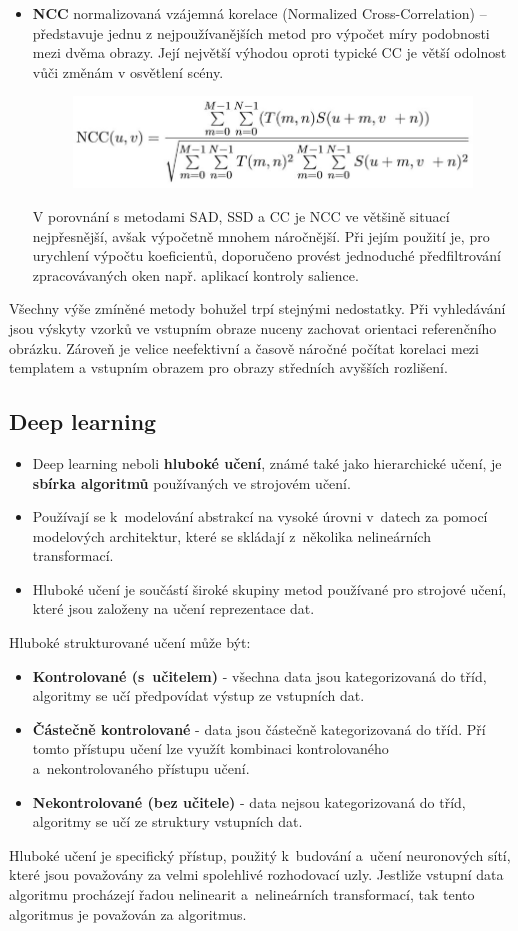 \begin{itemize}
\item \textbf{NCC} normalizovaná vzájemná korelace (Normalized Cross-Correlation) -- představuje jednu z nejpoužívanějších metod pro výpočet míry podobnosti mezi dvěma obrazy. Její největší výhodou oproti typické CC je větší odolnost vůči změnám v osvětlení scény.
\begin{figure}[H]
\centering
\includegraphics[width=.6\linewidth]{assets/9_ncc}
\end{figure}
V porovnání s metodami SAD, SSD a CC je NCC ve většině situací nejpřesnější, avšak výpočetně mnohem náročnější. Při jejím použití je, pro urychlení výpočtu koeficientů, doporučeno provést jednoduché předfiltrování zpracovávaných oken např. aplikací kontroly salience.
\end{itemize}
Všechny výše zmíněné metody bohužel trpí stejnými nedostatky. Při vyhledávání jsou výskyty vzorků ve vstupním obraze nuceny zachovat orientaci referenčního obrázku. Zároveň je velice neefektivní a časově náročné počítat korelaci mezi templatem a vstupním obrazem pro obrazy středních avyšších rozlišení.

\subsection{Deep learning}
\begin{itemize}
  \item Deep learning neboli \textbf{hluboké učení}, známé také jako hierarchické učení, je \textbf{sbírka algoritmů} používaných ve strojovém učení.
  \item Používají se k~modelování abstrakcí na vysoké úrovni v~datech za pomocí modelových architektur, které se skládají z~několika nelineárních transformací.
  \item Hluboké učení je součástí široké skupiny metod používané pro strojové učení, které jsou založeny na učení reprezentace dat.
\end{itemize}
Hluboké strukturované učení může být:
\begin{itemize}
  \item{\textbf{Kontrolované (s~učitelem)} - všechna data jsou kategorizovaná do tříd, algoritmy se učí předpovídat výstup ze vstupních dat.}
  \item{\textbf{Částečně kontrolované} - data jsou částečně kategorizovaná do tříd. Pří tomto přístupu učení lze využít kombinaci kontrolovaného a~nekontrolovaného přístupu učení.}
  \item{\textbf{Nekontrolované (bez učitele)} - data nejsou kategorizovaná do tříd, algoritmy se učí ze struktury vstupních dat.}
\end{itemize}
Hluboké učení je specifický přístup, použitý k~budování a~učení neuronových sítí, které jsou považovány za velmi spolehlivé rozhodovací uzly. Jestliže vstupní data algoritmu procházejí řadou nelinearit a~nelineárních transformací, tak tento algoritmus je považován za  algoritmus. 

